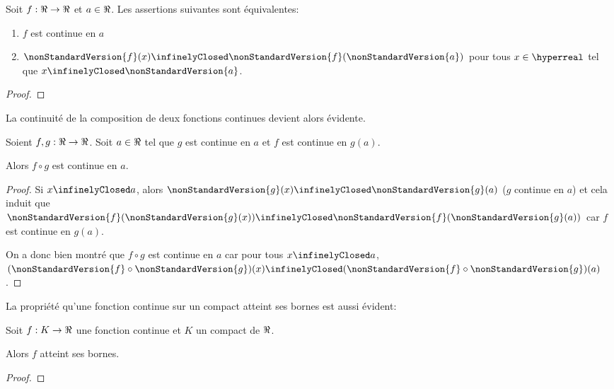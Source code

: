 \begin{proposition}
	Soit $f : \real \rightarrow \real$ et $a \in \real$. Les assertions
	suivantes sont équivalentes:
	\begin{enumerate}
		\item $f$ est continue en $a$
		\item $\nonStandardVersion{f}(x) \infinelyClosed
			\nonStandardVersion{f}(\nonStandardVersion{a})$ pour tous $x
			\in \hyperreal$ tel que $x \infinelyClosed \nonStandardVersion{a}$.
	\end{enumerate}
\end{proposition}

\ifdefined\outputproof
\begin{proof}

\end{proof}
\fi

La continuité de la composition de deux fonctions continues devient alors
évidente.

\begin{proposition}
	Soient $f, g : \real \rightarrow \real$. Soit $a \in \real$ tel que $g$ est
	continue en $a$ et $f$ est continue en $g(a)$.

	Alors $f \circ g$ est continue en $a$.
\end{proposition}

\ifdefined\outputproof
\begin{proof}
	Si $x \infinelyClosed a$, alors $\nonStandardVersion{g}(x) \infinelyClosed \nonStandardVersion{g}(a)$ ($g$
	continue en $a$) et
	cela induit que $\nonStandardVersion{f}(\nonStandardVersion{g}(x))
	\infinelyClosed \nonStandardVersion{f}(\nonStandardVersion{g}(a))$ car $f$ est continue en $g(a)$.

	On a donc bien montré que $f \circ g$ est continue en $a$ car pour tous $x \infinelyClosed
	a$, $(\nonStandardVersion{f} \circ \nonStandardVersion{g}) (x) \infinelyClosed (\nonStandardVersion{f}
	\circ \nonStandardVersion{g})(a)$.
\end{proof}
\fi

La propriété qu'une fonction continue sur un compact atteint ses bornes est
aussi évident:

\begin{proposition}
	Soit $f : K \rightarrow \real$ une fonction continue et $K$ un compact de
	$\real$.

	Alors $f$ atteint ses bornes.
\end{proposition}

\ifdefined\outputproof
\begin{proof}

\end{proof}
\fi

